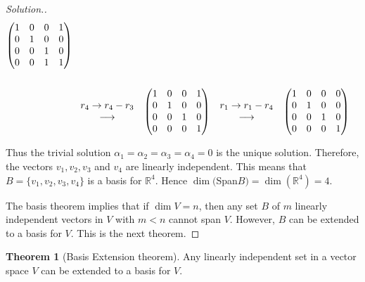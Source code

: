 \documentclass[11pt,a4paper]{article}
\theoremstyle{definition}
\newtheorem{thm}{Theorem}[subsection]
\newenvironment{solution}
  {\renewcommand{\qedsymbol}{}\begin{proof}[\textit{Solution}.]}
  {\end{proof}}
\begin{document}
\begin{solution}
\begin{align*}
\begin{matrix}
\end{matrix}
\hspace{0.3cm}
\begin{pmatrix}
1&0&0&1\\0&1&0&0\\0&0&1&0\\0&0&1&1\\
\end{pmatrix}\\\\
& \hspace{0.3cm}
\begin{matrix}
r_4\rightarrow r_4-r_3\\ \longrightarrow \\
\end{matrix}
\hspace{0.3cm}
\begin{pmatrix}
1&0&0&1\\0&1&0&0\\0&0&1&0\\0&0&0&1\\
\end{pmatrix}
\hspace{0.3cm}
\begin{matrix}
r_1\rightarrow r_1-r_4\\ \longrightarrow\\
\end{matrix}
\hspace{0.3cm}
\begin{pmatrix}
1&0&0&0\\0&1&0&0\\0&0&1&0\\0&0&0&1\\
\end{pmatrix}
\end{align*}

Thus the trivial solution $\alpha_1=\alpha_2=\alpha_3=\alpha_4=0$ is the unique solution. Therefore, the vectors $v_1,v_2,v_3$ and $v_4$ are linearly independent. This means that $B=\{v_1,v_2,v_3,v_4\}$ is a basis for $\mathbb{R}^4$. Hence $\dim($Span$B)=\dim(\mathbb{R}^4)=4$.

The basis theorem implies that if $\dim V=n$, then any set $B$ of $m$ linearly independent vectors in $V$ with $m<n$ cannot span $V$. However, $B$ can be extended to a basis for $V$. This is the next theorem.
\end{solution}


\begin{thm}[Basis Extension theorem]
Any linearly independent set in a vector space $V$ can be extended to a basis for $V$.
\end{thm}
\end{document}
